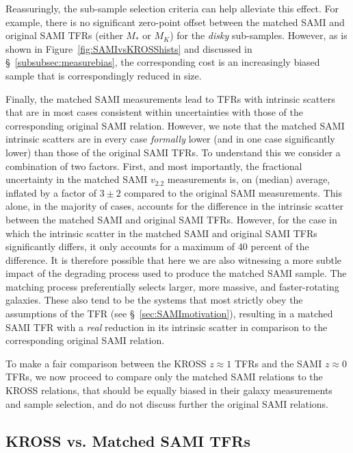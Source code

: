 \documentclass[a4paper,fleqn,usenatbib]{mnras}
\begin{document}
{Reassuringly, the sub-sample selection criteria can help alleviate this effect. For example, there is no significant zero-point offset between the matched SAMI and original SAMI TFRs (either $M_{*}$ or $M_{K}$) for the \textit{disky} sub-samples. However, as is shown in Figure~\ref{fig:SAMIvsKROSShists} and discussed in \S~\ref{subsubsec:measurebias}, the corresponding cost is an increasingly biased sample that is correspondingly reduced in size. 

Finally, the matched SAMI measurements lead to TFRs with intrinsic scatters that are in most cases consistent within uncertainties with those of the corresponding original SAMI relation. However, we note that the matched SAMI intrinsic scatters are in every case {\it formally} lower (and in one case significantly lower) than those of the original SAMI TFRs. To understand this we consider a combination of two factors. First, and most importantly, the fractional uncertainty in the matched SAMI $v_{2.2}$ measurements is, on (median) average, inflated by a factor of $3 \pm 2$ compared to the original SAMI measurements. This alone, in the majority of cases, accounts for the difference in the intrinsic scatter between the matched SAMI and original SAMI TFRs. However, for the case in which the intrinsic scatter in the matched SAMI and original SAMI TFRs significantly differs, it only accounts for a maximum of 40 percent of the difference. It is therefore possible that here we are also witnessing a more subtle impact of the degrading process used to produce the matched SAMI sample. The matching process preferentially selects larger, more massive, and faster-rotating galaxies. These also tend to be the systems that most strictly obey the assumptions of the TFR (see \S~\ref{sec:SAMImotivation}), resulting in a matched SAMI TFR with a \textit{real} reduction in its intrinsic scatter in comparison to the corresponding original SAMI relation.

To make a fair comparison between the KROSS $z\approx1$ TFRs and the SAMI $z\approx0$ TFRs, we now proceed to compare only the matched SAMI relations to the KROSS relations, that should be equally biased in their galaxy measurements and sample selection, and do not discuss further the original SAMI relations.   

\subsection{KROSS vs. Matched SAMI TFRs}
\label{subsec:KROSSvsLQ}

}
\end{document}
